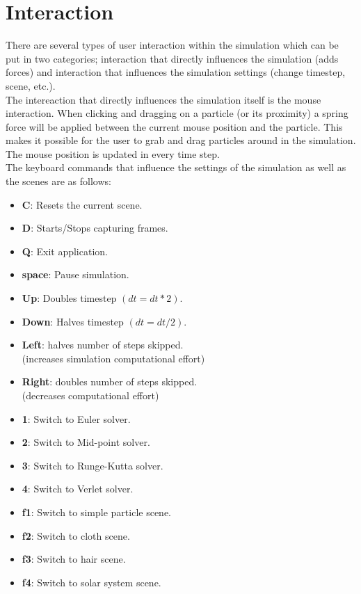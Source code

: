 \chapter{Interaction}
There are several types of user interaction within the simulation which can be put in two categories; interaction that directly influences the simulation (adds forces) and interaction that influences the simulation settings (change timestep, scene, etc.). \\

\smallskip
The intereaction that directly influences the simulation itself is the mouse interaction. When clicking and dragging on a particle (or its proximity) a spring force will be applied between the current mouse position and the particle. This makes it possible for the user to grab and drag particles around in the simulation. The mouse position is updated in every time step. \\

\smallskip
The keyboard commands that influence the settings of the simulation as well as the scenes are as follows: \\
\begin{itemize}
  \item \textbf{C}: Resets the current scene.
  \item \textbf{D}: Starts/Stops capturing frames.
  \item \textbf{Q}: Exit application.
  \item \textbf{space}: Pause simulation.
  \item \textbf{Up}: Doubles timestep $(dt=dt*2)$.
  \item \textbf{Down}: Halves timestep $(dt = dt/2)$.
  \item \textbf{Left}: halves number of steps skipped. \\ 
  (increases simulation computational effort) 
  \item \textbf{Right}: doubles number of steps skipped. \\
  (decreases computational effort)
  \item \textbf{1}: Switch to Euler solver.
  \item \textbf{2}: Switch to Mid-point solver.
  \item \textbf{3}: Switch to Runge-Kutta solver.
  \item \textbf{4}: Switch to Verlet solver.
  \item \textbf{f1}: Switch to simple particle scene.
  \item \textbf{f2}: Switch to cloth scene.
  \item \textbf{f3}: Switch to hair scene.
  \item \textbf{f4}: Switch to solar system scene.
\end{itemize}



